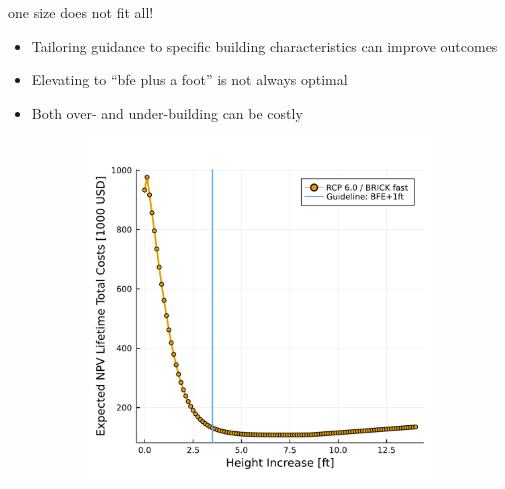 \begin{block}{one size does not fit all!}
    \begin{itemize}
        \item Tailoring guidance to specific building characteristics can improve outcomes
        \item Elevating to ``\acrshort{bfe} plus a foot'' is not always optimal \cite{xian_elevation:2017,zarekarizi_suboptimal:2020}
        \item Both over- and under-building can be costly \cite{ansar_bigisfragile:2017,DossGollin:2019}
    \end{itemize}
    \begin{framed}
        \begin{figure}
            \centering
            \begin{subfigure}{0.48\textwidth}
                \includegraphics[width=\textwidth]{5.5.pdf}
            \end{subfigure}
            \hfill
            \begin{subfigure}{0.48\textwidth}

\end{subfigure}
\end{figure}
\end{framed}
\end{block}
